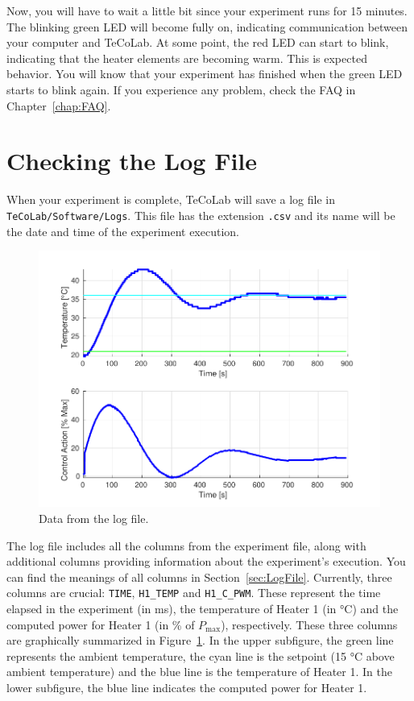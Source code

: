 \documentclass[12pt]{report}
\begin{document}
Now, you will have to wait a little bit since your experiment runs for 15 minutes. The blinking green LED will become fully on, indicating communication between your computer and TeCoLab. At some point, the red LED can start to blink, indicating that the heater elements are becoming warm. This is expected behavior. You will know that your experiment has finished when the green LED starts to blink again. If you experience any problem, check the FAQ in Chapter~\ref{chap:FAQ}.


\section{Checking the Log File}

When your experiment is complete, TeCoLab will save a log file in \texttt{TeCoLab/Software/Logs}. This file has the extension \texttt{.csv} and its name will be the date and time of the experiment execution.

\begin{figure}[!htbp]
\centering
\includegraphics[scale=0.75]{Figures/TeCoLabExperimentExample.pdf}
\caption{Data from the log file.}\label{fig:ExperimentLog}
\end{figure}

The log file includes all the columns from the experiment file, along with additional columns providing information about the experiment's execution. You can find the meanings of all columns in Section~\ref{sec:LogFile}. Currently, three columns are crucial: \texttt{TIME}, \texttt{H1\_TEMP} and \texttt{H1\_C\_PWM}. These represent the time elapsed in the experiment (in ms), the temperature of Heater 1 (in °C) and the computed power for Heater 1 (in \% of $P_{\text{max}}$), respectively. These three columns are graphically summarized in Figure~\ref{fig:ExperimentLog}. In the upper subfigure, the green line represents the ambient temperature, the cyan line is the setpoint (15 °C above ambient temperature) and the blue line is the temperature of Heater 1. In the lower subfigure, the blue line indicates the computed power for Heater 1.
\end{document}
